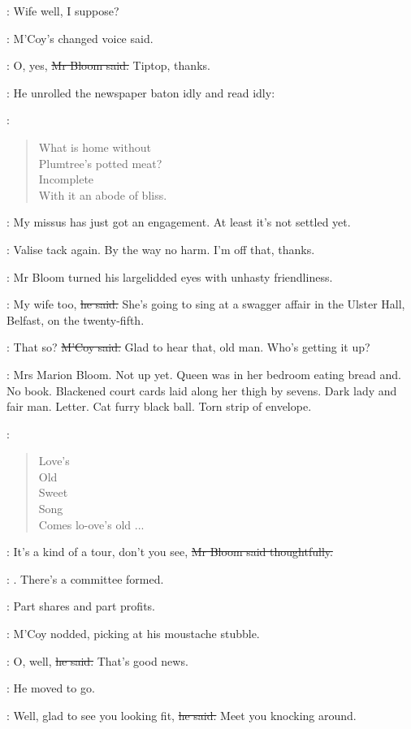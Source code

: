 \mccoy:
Wife well, I suppose?

:
M'Coy's changed voice said.

\Bloom:
O, yes,
\sout{Mr Bloom said.}
Tiptop, thanks.

:
He unrolled the newspaper baton idly and read idly:

\BloomInt:
\begin{verse}
    What is home without \\
    Plumtree's potted meat? \\
    Incomplete \\
    With it an abode of bliss.
\end{verse}

\mccoy:
My missus has just got an engagement.
At least it's not settled yet.

\BloomInt:
Valise tack again.
By the way no harm.
I'm off that, thanks.

:
Mr Bloom turned his largelidded eyes
with unhasty friendliness.

\Bloom:
My wife too,
\sout{he said.}
She's going to sing at a swagger affair in the Ulster Hall, Belfast,
on the twenty-fifth.

\mccoy:
That so?
\sout{M'Coy said.}
Glad to hear that, old man.
Who's getting it up?

\BloomInt:
Mrs Marion Bloom.
Not up yet.
Queen was in her bedroom eating bread and.
No book.
Blackened court cards laid along her thigh by sevens.
Dark lady and fair man.
Letter.
Cat furry black ball.
Torn strip of envelope.

\BloomInt:
\begin{verse}
    Love's \\
    Old \\
    Sweet \\
    Song
 \\
    Comes lo-ove's old ...
\end{verse}

\Bloom:
It's a kind of a tour,
don't you see,
\sout{Mr Bloom said thoughtfully.}

\BloomInt:
.
There's a committee formed.

\Bloom:
Part shares and part profits.

:
M'Coy nodded,
picking at his moustache stubble.

\mccoy:
O, well,
\sout{he said.}
That's good news.

:
He moved to go.

\mccoy:
Well, glad to see you looking fit,
\sout{he said.}
Meet you knocking around.

